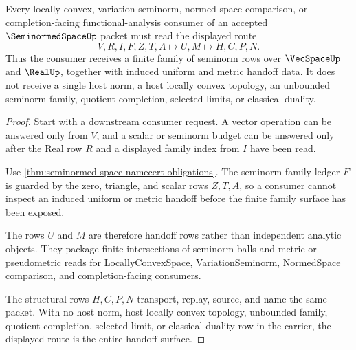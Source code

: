 \begin{theorem}
\label{thm:seminormed-space-functional-analysis-handoff}
Every locally convex, variation-seminorm, normed-space comparison, or completion-facing functional-analysis consumer of an accepted $\SeminormedSpaceUp$ packet must read the displayed route
$$
V,R,I,F,Z,T,A \longmapsto U,M \longmapsto H,C,P,N .
$$
Thus the consumer receives a finite family of seminorm rows over $\VecSpaceUp$ and $\RealUp$, together with induced uniform and metric handoff data. It does not receive a single host norm, a host locally convex topology, an unbounded seminorm family, quotient completion, selected limits, or classical duality.
\end{theorem}
\begin{proof}
Start with a downstream consumer request. A vector operation can be answered only from $V$, and a scalar or seminorm budget can be answered only after the Real row $R$ and a displayed family index from $I$ have been read.

Use \autoref{thm:seminormed-space-namecert-obligations}. The seminorm-family ledger $F$ is guarded by the zero, triangle, and scalar rows $Z,T,A$, so a consumer cannot inspect an induced uniform or metric handoff before the finite family surface has been exposed.

The rows $U$ and $M$ are therefore handoff rows rather than independent analytic objects. They package finite intersections of seminorm balls and metric or pseudometric reads for LocallyConvexSpace, VariationSeminorm, NormedSpace comparison, and completion-facing consumers.

The structural rows $H,C,P,N$ transport, replay, source, and name the same packet. With no host norm, host locally convex topology, unbounded family, quotient completion, selected limit, or classical-duality row in the carrier, the displayed route is the entire handoff surface.
\end{proof}




